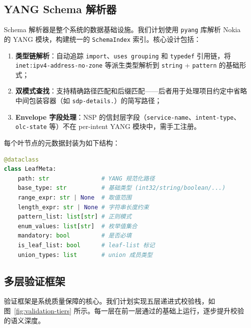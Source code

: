 \documentclass[12pt, a4paper]{article}
\newcommand{\yang}{\textsc{YANG}}
\newcommand{\nsp}{\textsc{NSP}}
\begin{document}
\subsection{YANG Schema 解析器}
\label{sec:yang-parser}

Schema 解析器是整个系统的数据基础设施。我们计划使用 \texttt{pyang} 库解析 Nokia 的 \yang{} 模块，构建统一的 \texttt{SchemaIndex} 索引。核心设计包括：

\begin{enumerate}
  \item \textbf{类型链解析}：自动追踪 \texttt{import}、\texttt{uses grouping} 和 \texttt{typedef} 引用链，将 \texttt{inet:ipv4-address-no-zone} 等派生类型解析到 \texttt{string} + \texttt{pattern} 的基础形式；
  \item \textbf{双模式查找}：支持精确路径匹配和后缀匹配——后者用于处理项目约定中省略中间包装容器（如 \texttt{sdp-details.}）的简写路径；
  \item \textbf{Envelope 字段处理}：\nsp{} 的信封层字段（\texttt{service-name}、\texttt{intent-type}、\texttt{olc-state} 等）不在 per-intent \yang{} 模块中，需手工注册。
\end{enumerate}

\noindent
每个叶节点的元数据封装为如下结构：

\begin{lstlisting}[language=Python, caption={LeafMeta 数据结构}]
@dataclass
class LeafMeta:
    path: str               # YANG 规范化路径
    base_type: str          # 基础类型 (int32/string/boolean/...)
    range_expr: str | None  # 取值范围
    length_expr: str | None # 字符串长度约束
    pattern_list: list[str] # 正则模式
    enum_values: list[str]  # 枚举值集合
    mandatory: bool         # 是否必填
    is_leaf_list: bool      # leaf-list 标记
    union_types: list       # union 成员类型
\end{lstlisting}

\subsection{多层验证框架}
\label{sec:validation}

验证框架是系统质量保障的核心。我们计划实现五层递进式校验栈，如图~\ref{fig:validation-tiers} 所示。每一层在前一层通过的基础上运行，逐步提升校验的语义深度。
\end{document}
